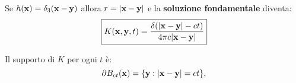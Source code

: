 Se $\displaystyle h(\x) =\delta _{3}(\x -\y)$ allora $\displaystyle r=| \x -\y| $ e la \textbf{soluzione fondamentale} diventa:
\begin{equation}
    \boxed{K(\x ,\y ,t) =\frac{\delta (| \x -\y| -ct)}{4\pi c| \x -\y| }}
\end{equation}
\begin{oss}
    Il supporto di $K$ per ogni $t$ è:
    \begin{equation}
        \partial B_{ct}(\x) =\{\y :| \x -\y| =ct\} ,
    \end{equation}

    \begin{figure}[H]
        \centering


        \begin{tikzpicture}[x=0.75pt,y=0.75pt,yscale=-1,xscale=1]


\end{tikzpicture}
\end{figure}
\end{oss}

